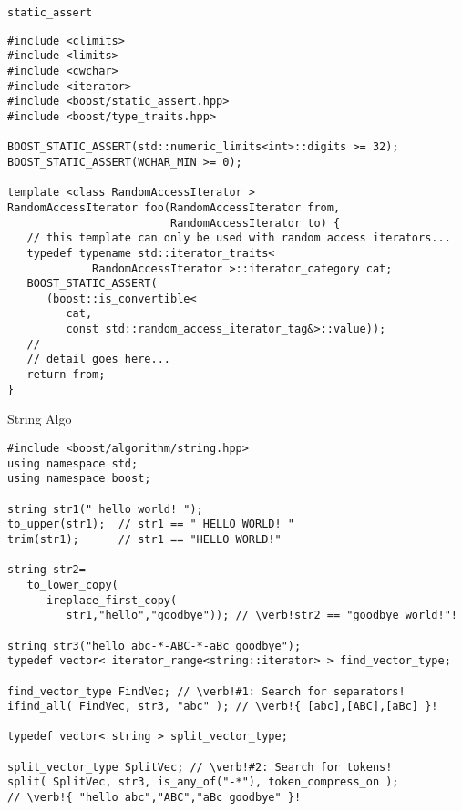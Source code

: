 \documentclass{beamer}
\begin{document}
\begin{frame}[fragile]{{\tt static\_assert}}
\small
\begin{lstlisting}
#include <climits>
#include <limits>
#include <cwchar>
#include <iterator>
#include <boost/static_assert.hpp>
#include <boost/type_traits.hpp>

BOOST_STATIC_ASSERT(std::numeric_limits<int>::digits >= 32);
BOOST_STATIC_ASSERT(WCHAR_MIN >= 0);

template <class RandomAccessIterator >
RandomAccessIterator foo(RandomAccessIterator from,
                         RandomAccessIterator to) {
   // this template can only be used with random access iterators...
   typedef typename std::iterator_traits<
             RandomAccessIterator >::iterator_category cat;
   BOOST_STATIC_ASSERT(
      (boost::is_convertible<
         cat,
         const std::random_access_iterator_tag&>::value));
   //
   // detail goes here...
   return from;
}

\end{lstlisting}
\end{frame}

\begin{frame}[fragile]{String Algo}
\small
\begin{lstlisting}
#include <boost/algorithm/string.hpp>
using namespace std;
using namespace boost;

string str1(" hello world! ");
to_upper(str1);  // str1 == " HELLO WORLD! "
trim(str1);      // str1 == "HELLO WORLD!"

string str2=
   to_lower_copy(
      ireplace_first_copy(
         str1,"hello","goodbye")); // \verb!str2 == "goodbye world!"!

string str3("hello abc-*-ABC-*-aBc goodbye");
typedef vector< iterator_range<string::iterator> > find_vector_type;

find_vector_type FindVec; // \verb!#1: Search for separators!
ifind_all( FindVec, str3, "abc" ); // \verb!{ [abc],[ABC],[aBc] }!

typedef vector< string > split_vector_type;

split_vector_type SplitVec; // \verb!#2: Search for tokens!
split( SplitVec, str3, is_any_of("-*"), token_compress_on ); 
// \verb!{ "hello abc","ABC","aBc goodbye" }!
\end{lstlisting}
\end{frame}
\end{document}
